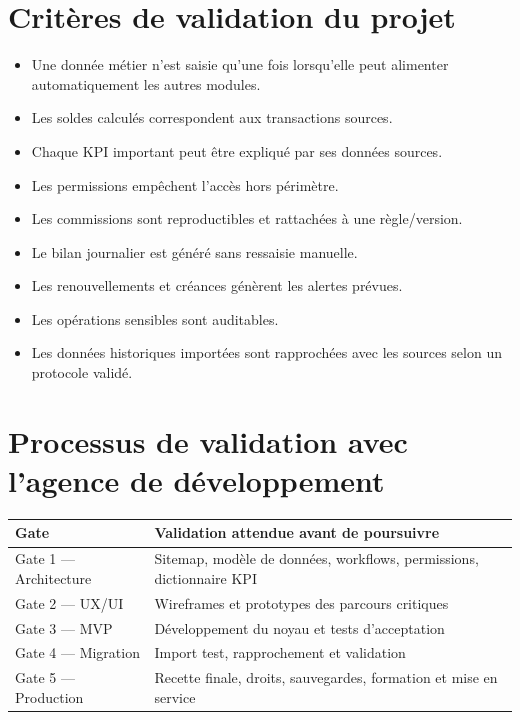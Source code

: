 \documentclass[11pt,a4paper]{article}
\newcommand{\tableheader}[2]{\textbf{#1} & \textbf{#2} \\ \hline}
\begin{document}
\section{Critères de validation du projet}

\begin{itemize}
  \item Une donnée métier n'est saisie qu'une fois lorsqu'elle peut alimenter automatiquement les autres modules.
  \item Les soldes calculés correspondent aux transactions sources.
  \item Chaque KPI important peut être expliqué par ses données sources.
  \item Les permissions empêchent l'accès hors périmètre.
  \item Les commissions sont reproductibles et rattachées à une règle/version.
  \item Le bilan journalier est généré sans ressaisie manuelle.
  \item Les renouvellements et créances génèrent les alertes prévues.
  \item Les opérations sensibles sont auditables.
  \item Les données historiques importées sont rapprochées avec les sources selon un protocole validé.
\end{itemize}

\section{Processus de validation avec l'agence de développement}

\begin{tabularx}{\textwidth}{|l|X|}
\hline
\tableheader{Gate}{Validation attendue avant de poursuivre}
Gate 1 --- Architecture & Sitemap, modèle de données, workflows, permissions, dictionnaire KPI \\ \hline
Gate 2 --- UX/UI & Wireframes et prototypes des parcours critiques \\ \hline
Gate 3 --- MVP & Développement du noyau et tests d'acceptation \\ \hline
Gate 4 --- Migration & Import test, rapprochement et validation \\ \hline
Gate 5 --- Production & Recette finale, droits, sauvegardes, formation et mise en service \\ \hline
\end{tabularx}
\end{document}
